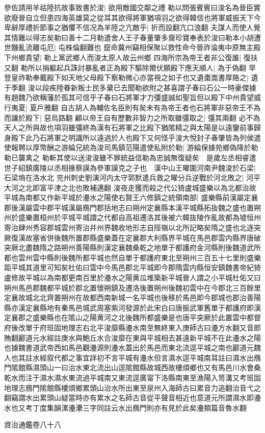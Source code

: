 參佐請用羊祜陸抗故事致書於浚|{
	欲用敵國交鄰之禮}
勒以問張賓賓曰浚名為晉臣實欲廢晉自立但患四海英雄莫之從耳其欲得將軍猶項羽之欲得韓信也將軍威振天下今卑辭厚禮折節事之猶懼不信况為羊陸之亢敵乎|{
	折而設翻亢口浪翻}
夫謀人而使人覺其情難以得志矣勒曰善十二月勒遣舍人王子春董肇多齎珍寶奉表於浚曰勒本小胡遭世饑亂流離屯厄|{
	屯株倫翻難也}
竄命冀州竊相保聚以救性命今晉祚淪夷中原無主殿下州鄉貴望|{
	勒上黨武鄉人而浚太原人故云州鄉}
四海所宗為帝王者非公復誰|{
	復扶又翻}
勒所以捐軀起兵誅討暴亂者正為殿下驅除爾伏願殿下應天順人|{
	為于偽翻}
早登皇祚勒奉戴殿下如天地父母殿下察勒微心亦當視之如子也又遺棗嵩書厚賂之|{
	遺于季翻}
浚以段疾陸眷新叛士民多棄已去聞勒欲附之甚喜謂子春曰石公一時豪傑據有趙魏乃欲稱藩於孤其可信乎子春曰石將軍才力彊盛誠如聖旨但以殿下中州貴望威行夷夏|{
	夏戶雅翻}
自古胡人為輔佐名臣則有矣未有為帝王者也石將軍非惡帝王不為而讓於殿下|{
	惡烏路翻}
顧以帝王自有歷數非智力之所取雖彊取之|{
	彊其兩翻}
必不為天人之所與故也項羽雖彊終為漢有石將軍之比殿下猶隂精之與太陽是以遠鑒前事歸身殿下此乃石將軍之明識所以遠過於人也殿下又何怪乎浚大悅封子春肇皆為列侯遣使報聘以厚幣酬之游綸兄統為浚司馬鎮范陽遣使私附於勒|{
	游綸保據苑鄉偽降於勒勒已襲禽之}
勒斬其使以送浚浚雖不罪統益信勒為忠誠無復疑矣　是歲左丞相睿遣世子紹鎮廣陵以丞相掾蔡謨為參軍謨克之子也　漢中山王曜圍河南尹魏浚於石梁|{
	石梁塢在洛水北}
兖州刺史劉演河内太守郭默遣兵救之曜分兵逆戰於河北敗之|{
	河平大河之北即富平津之北也敗補邁翻}
浚夜走獲而殺之代公猗盧城盛樂以為北都治故平城為南都又作新平城於灅水之陽使右賢王六修鎮之統領南部|{
	盛樂縣前漢屬定襄郡後漢屬雲中郡平城漢屬鴈門郡括地志曰朔州定襄縣本漢平城縣拓抜魏之盛也置朔州於盛樂置桓州於平城平城謂之代都自高祖遷洛其後被六韓抜陵作亂故都為墟恒州寄治肆州秀容郡城雲州寄治并州界魏收地形志自陘嶺以北所記略矣隋之盛也北逐突厥復漢故塞省併後魏所置郡縣盛樂蓋在定襄郡大利縣界平城在馬邑郡雲内縣界唐破突厥北盡魏隋之路朔州善陽縣則漢定襄魏桑乾之地單于都護府金河縣則後魏道武所都也雲州雲中縣則後魏所都平城也然自單于都護府東北至朔州三百五十七里則盛樂距平城其道里可知矣杜佑曰雲中今馬邑郡北平城即今郡隋雲内縣恒安鎮魏書帝紀猗盧修故平城以為南都更南百里於灅水之陽黄瓜堆築新平城晉人謂之小平城杜佑又曰朔州馬邑郡魏都平城於郡北置懷朔鎮及遷洛後置朔州後魏初雲中在今郡北三百餘里定襄故城北北齊置朔州在故都西南新城一名平城也後移於馬邑即今郡城也郡治善陽縣亦漢定襄縣地有秦馬邑城武周塞紫河發源於此宋白曰唐振武軍舊單于都護府即漢定襄郡之盛樂縣也在隂山之陽黄河之北後魏所都盛樂是也唐平突厥於此置雲中都督府後改單于府班固地理志右北平浚靡縣灅水南至無終東入庚師古曰灅方水翻又音郎賄翻酈道元水經註庚水與鮑丘水合浚靡在東與平城相去甚遠新平城不在此灅水之陽也據魏書道武帝西如馬邑觀灅源則灅水蓋出於馬邑而東北流逕平城之南也酈道元魏人也其註水經叙代都之事宜詳初不言平城有灅水但言濕水逕平城南耳註曰濕水出鴈門隂館縣濕頭山一曰治水東北流出山逕隂館縣故城西故樓煩鄉也又有馬邑川水會桑乾水而注于濕水濕水東流過平城南又東流逕廣甯下洛縣南東至漁陽入笥溝又考班固地理志鴈門隂館縣樓煩鄉累頭山治水所出東至泉州入海師古曰累音力追翻治音弋之翻竊謂水出累頭山疑當時亦有累水之名師古音從平聲音相近也意道元所謂濕水即灅水也又考丁度集韻漯灅㶟三字同註云水出鴈門則亦有見於此矣灅類篇音魯水翻}


資治通鑑卷八十八

